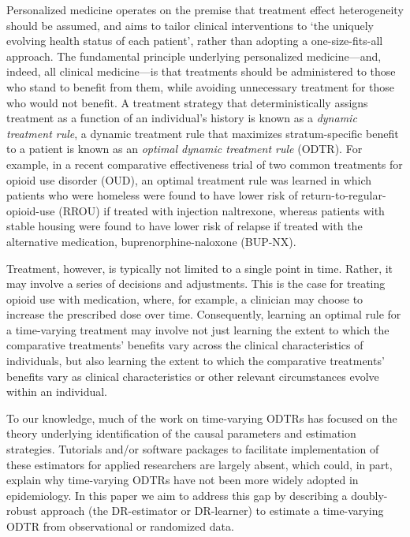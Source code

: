 \documentclass[11pt]{article}
\theoremstyle{example}
\begin{document}
Personalized medicine operates on the premise that treatment effect heterogeneity should be assumed, and aims to tailor clinical interventions to `the uniquely evolving health status of each patient', rather than adopting a one-size-fits-all approach.\cite{kosorok2021introduction,kosorok2019precision} The fundamental principle underlying personalized medicine---and, indeed, all clinical medicine---is that treatments should be administered to those who stand to benefit from them, while avoiding unnecessary treatment for those who would not benefit. A treatment strategy that deterministically assigns treatment as a function of an individual's history is known as a \textit{dynamic treatment rule}, a dynamic treatment rule that maximizes stratum-specific benefit to a patient is known as an \textit{optimal dynamic treatment rule} (ODTR).\cite{murphyODTR2003} For example, in a recent comparative effectiveness trial of two common treatments for opioid use disorder (OUD), an optimal treatment rule was learned in which patients who were homeless were found to have lower risk of return-to-regular-opioid-use (RROU) if treated with injection naltrexone, whereas patients with stable housing were found to have lower risk of relapse if treated with the alternative medication, buprenorphine-naloxone (BUP-NX).\cite{rudolph2021optimizing}

Treatment, however, is typically not limited to a single point in time. Rather, it may involve a series of decisions and adjustments. This is the case for treating opioid use with medication, where, for example, a clinician may choose to increase the prescribed dose over time. 
Consequently, learning an optimal rule for a time-varying treatment may involve not just learning the extent to which the comparative treatments' benefits vary across the clinical characteristics of individuals, but also learning the extent to which the comparative treatments' benefits vary as clinical characteristics or other relevant circumstances evolve within an individual. 

To our knowledge, much of the work on time-varying ODTRs has focused on the theory underlying identification of the causal parameters and estimation strategies.\citep{murphyODTR2003,zhangSequential2013,luedtkeSLodtr,DiazEnsembleTTE,zhaoBowl} Tutorials and/or software packages to facilitate implementation of these estimators for applied researchers are largely absent, which could, in part, explain why time-varying ODTRs have not been more widely adopted in epidemiology. In this paper we aim to address this gap by describing a doubly-robust approach (the DR-estimator or DR-learner) to estimate a time-varying ODTR from observational or randomized data. 
\end{document}
